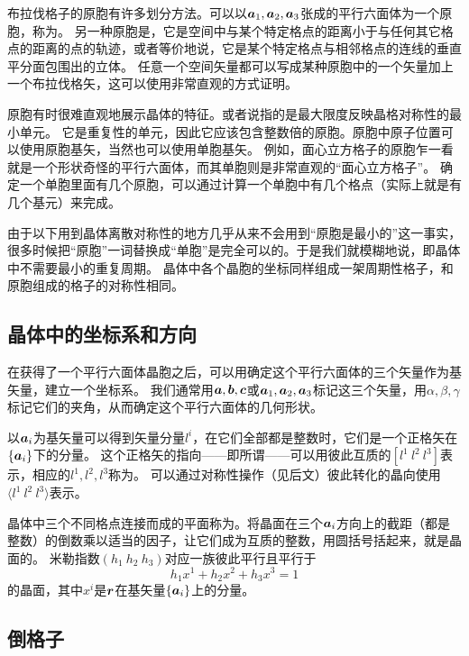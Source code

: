 布拉伐格子的原胞有许多划分方法。可以以$\vb*{a}_1, \vb*{a}_2, \vb*{a}_3$张成的平行六面体为一个原胞，称为。
另一种原胞是，它是空间中与某个特定格点的距离小于与任何其它格点的距离的点的轨迹，或者等价地说，它是某个特定格点与相邻格点的连线的垂直平分面包围出的立体。
任意一个空间矢量都可以写成某种原胞中的一个矢量加上一个布拉伐格矢，这可以使用非常直观的方式证明。

原胞有时很难直观地展示晶体的特征。或者说指的是最大限度反映晶格对称性的最小单元。
它是重复性的单元，因此它应该包含整数倍的原胞。原胞中原子位置可以使用原胞基矢，当然也可以使用单胞基矢。
例如，面心立方格子的原胞乍一看就是一个形状奇怪的平行六面体，而其单胞则是非常直观的“面心立方格子”。
确定一个单胞里面有几个原胞，可以通过计算一个单胞中有几个格点（实际上就是有几个基元）来完成。

由于以下用到晶体离散对称性的地方几乎从来不会用到“原胞是最小的”这一事实，很多时候把“原胞”一词替换成“单胞”是完全可以的。于是我们就模糊地说，即晶体中不需要最小的重复周期。
晶体中各个晶胞的坐标同样组成一架周期性格子，和原胞组成的格子的对称性相同。

\subsection{晶体中的坐标系和方向}

在获得了一个平行六面体晶胞之后，可以用确定这个平行六面体的三个矢量作为基矢量，建立一个坐标系。
我们通常用$\vb*{a}, \vb*{b}, \vb*{c}$或$\vb*{a}_1, \vb*{a}_2, \vb*{a}_3$标记这三个矢量，用$\alpha, \beta, \gamma$标记它们的夹角，从而确定这个平行六面体的几何形状。

以$\vb*{a}_i$为基矢量可以得到矢量分量$l^i$，在它们全部都是整数时，它们是一个正格矢在$\{\vb*{a}_i\}$下的分量。
这个正格矢的指向——即所谓——可以用彼此互质的$[l^1 \  l^2 \  l^3]$表示，相应的$l^1, l^2, l^3$称为。
可以通过对称性操作（见后文）彼此转化的晶向使用$\langle l^1 \  l^2 \  l^3 \rangle$表示。

晶体中三个不同格点连接而成的平面称为。将晶面在三个$\vb*{a}_i$方向上的截距（都是整数）的倒数乘以适当的因子，让它们成为互质的整数，用圆括号括起来，就是晶面的。
米勒指数$(h_1 \ h_2 \ h_3)$对应一族彼此平行且平行于
\begin{equation}
    h_1 x^1 + h_2 x^2 + h_3 x^3 = 1
\end{equation}
的晶面，其中$x^i$是$\vb*{r}$在基矢量$\{\vb*{a}_i\}$上的分量。

\subsection{倒格子}

